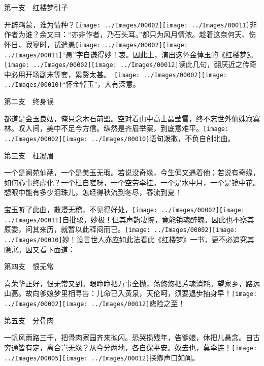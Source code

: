 第一支　红楼梦引子

开辟鸿蒙，谁为情种？{\texttt{[image: ../Images/00002]}\texttt{[image: ../Images/00011]}\footnotesize \kaishu 非作者为谁？余又曰：``亦非作者，乃石头耳。''}都只为风月情浓。趁着这奈何天、伤怀日、寂寥时，试遣愚{\texttt{[image: ../Images/00002]}\texttt{[image: ../Images/00011]}\footnotesize \kaishu ``愚''字自谦得妙！}衷。因此上，演出这怀金悼玉的《红楼梦》。{\texttt{[image: ../Images/00002]}\texttt{[image: ../Images/00012]}\footnotesize \kaishu 读此几句，翻厌近之传奇中必用开场副末等套，累赘太甚。　\texttt{[image: ../Images/00002]}\texttt{[image: ../Images/00010]}\footnotesize \kaishu ``怀金悼玉''，大有深意。}

第二支　终身误

都道是金玉良姻，俺只念木石前盟。空对着山中高士晶莹雪，终不忘世外仙姝寂寞林。叹人间，美中不足今方信。纵然是齐眉举案，到底意难平。{\texttt{[image: ../Images/00002]}\texttt{[image: ../Images/00010]}\footnotesize \kaishu 语句泼撒，不负自创北曲。}

第三支　枉凝眉

一个是阆苑仙葩，一个是美玉无瑕。若说没奇缘，今生偏又遇着他；若说有奇缘，如何心事终虚化？一个枉自嗟呀，一个空劳牵挂。一个是水中月，一个是镜中花。想眼中能有多少泪珠儿，怎经得秋流到冬尽，春流到夏！

宝玉听了此曲，散漫无稽，不见得好处，{\texttt{[image: ../Images/00002]}\texttt{[image: ../Images/00011]}\footnotesize \kaishu 自批驳，妙极！}但其声韵凄惋，竟能销魂醉魄。因此也不察其原委，问其来历，就暂以此释闷而已。{\texttt{[image: ../Images/00002]}\texttt{[image: ../Images/00010]}\footnotesize \kaishu 妙！设言世人亦应如此法看此《红楼梦》一书，更不必追究其隐寓。}因又看下面道：

第四支　恨无常

喜荣华正好，恨无常又到。眼睁睁把万事全抛，荡悠悠把芳魂消耗。望家乡，路远山高。故向爹娘梦里相寻告：儿命已入黄泉，天伦呵，须要退步抽身早！{\texttt{[image: ../Images/00002]}\texttt{[image: ../Images/00012]}\footnotesize \kaishu 悲险之至！}

第五支　分骨肉

一帆风雨路三千，把骨肉家园齐来抛闪。恐哭损残年，告爹娘，休把儿悬念。自古穷通皆有定，离合岂无缘？从今分两地，各自保平安。奴去也，莫牵连！{\texttt{[image: ../Images/00005]}\texttt{[image: ../Images/00012]}\footnotesize \kaishu 探卿声口如闻。}

